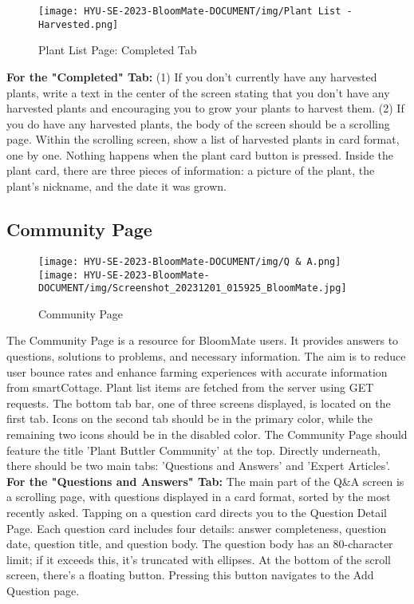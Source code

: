 \documentclass[conference, a4paper]{IEEEtran}
\begin{document}
    \begin{figure}[h]
    \centering
    \texttt{[image: HYU-SE-2023-BloomMate-DOCUMENT/img/Plant List - Harvested.png]}
    \label{fig}
    \caption{Plant List Page: Completed Tab}
    \end{figure}
    
\textbf{For the "Completed" Tab:}
    (1) If you don't currently have any harvested plants, write a text in the center of the screen stating that you don't have any harvested plants and encouraging you to grow your plants to harvest them. (2) If you do have any harvested plants, the body of the screen should be a scrolling page. Within the scrolling screen, show a list of harvested plants in card format, one by one. Nothing happens when the plant card button is pressed. Inside the plant card, there are three pieces of information: a picture of the plant, the plant's nickname, and the date it was grown.


\subsection{Community Page}
    \begin{figure}[h]
    \centerline{
        \texttt{[image: HYU-SE-2023-BloomMate-DOCUMENT/img/Q \& A.png]}
        \texttt{[image: HYU-SE-2023-BloomMate-DOCUMENT/img/Screenshot\_20231201\_015925\_BloomMate.jpg]}
    }
    \label{fig}
    \caption{Community Page}
    \end{figure}
The Community Page is a resource for BloomMate users. It provides answers to questions, solutions to problems, and necessary information. The aim is to reduce user bounce rates and enhance farming experiences with accurate information from smartCottage. Plant list items are fetched from the server using GET requests. The bottom tab bar, one of three screens displayed, is located on the first tab. Icons on the second tab should be in the primary color, while the remaining two icons should be in the disabled color. The Community Page should feature the title 'Plant Buttler Community' at the top. Directly underneath, there should be two main tabs: 'Questions and Answers' and 'Expert Articles'.\\

\textbf{For the "Questions and Answers" Tab: } The main part of the Q\&A screen is a scrolling page, with questions displayed in a card format, sorted by the most recently asked. Tapping on a question card directs you to the Question Detail Page. Each question card includes four details: answer completeness, question date, question title, and question body. The question body has an 80-character limit; if it exceeds this, it's truncated with ellipses. At the bottom of the scroll screen, there's a floating button. Pressing this button navigates to the Add Question page.\\
\end{document}
